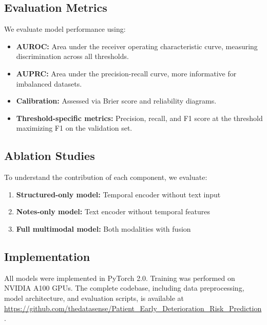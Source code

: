\subsection{Evaluation Metrics}

We evaluate model performance using:

\begin{itemize}
    \item \textbf{AUROC:} Area under the receiver operating characteristic curve, measuring discrimination across all thresholds.
    \item \textbf{AUPRC:} Area under the precision-recall curve, more informative for imbalanced datasets.
    \item \textbf{Calibration:} Assessed via Brier score and reliability diagrams.
    \item \textbf{Threshold-specific metrics:} Precision, recall, and F1 score at the threshold maximizing F1 on the validation set.
\end{itemize}

\subsection{Ablation Studies}

To understand the contribution of each component, we evaluate:

\begin{enumerate}
    \item \textbf{Structured-only model:} Temporal encoder without text input
    \item \textbf{Notes-only model:} Text encoder without temporal features
    \item \textbf{Full multimodal model:} Both modalities with fusion
\end{enumerate}

\subsection{Implementation}

All models were implemented in PyTorch 2.0. Training was performed on NVIDIA A100 GPUs. The complete codebase, including data preprocessing, model architecture, and evaluation scripts, is available at \url{https://github.com/thedatasense/Patient_Early_Deterioration_Risk_Prediction}.
